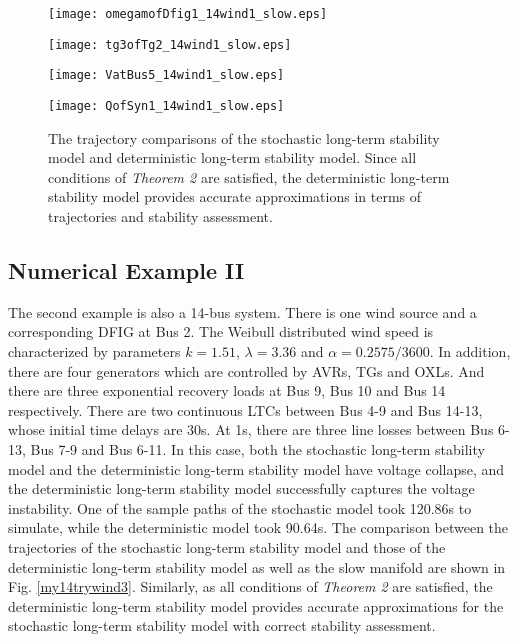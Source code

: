 \documentclass[journal]{IEEEtran}
\begin{document}
\begin{figure}[!ht]
\centering
\begin{minipage}[t]{0.5\linewidth}
\texttt{[image: omegamofDfig1\_14wind1\_slow.eps]}
\end{minipage}\begin{minipage}[t]{0.5\linewidth}
\texttt{[image: tg3ofTg2\_14wind1\_slow.eps]}
\end{minipage}
\begin{minipage}[t]{0.5\linewidth}
\texttt{[image: VatBus5\_14wind1\_slow.eps]}
\end{minipage}\begin{minipage}[t]{0.5\linewidth}
\texttt{[image: QofSyn1\_14wind1\_slow.eps]}
\end{minipage}
\caption{The trajectory comparisons of the stochastic long-term stability model and deterministic long-term stability model. Since all conditions of \textit{Theorem 2} are satisfied, the deterministic long-term stability model provides accurate approximations in terms of trajectories and stability assessment.}\label{my14wind1}
\end{figure}


\subsection{Numerical Example II}
The second example is also a 14-bus system. There is one wind source and a corresponding DFIG at Bus 2. The Weibull distributed wind speed is characterized by parameters $k=1.51$, $\lambda=3.36$ and $\alpha=0.2575/3600$. In addition, there are four generators which are controlled by AVRs, TGs and OXLs. And there are three exponential recovery loads at Bus 9, Bus 10 and Bus 14 respectively. There are two continuous LTCs between Bus 4-9 and Bus 14-13, whose initial time delays are 30s. At 1s, there are three line losses between Bus 6-13, Bus 7-9 and Bus 6-11. 
In this case, both the stochastic long-term stability model and the deterministic long-term stability model have voltage collapse, and the deterministic long-term stability model successfully captures the voltage instability. One of the sample paths of the stochastic model took 120.86s to simulate, while the deterministic model took 90.64s. The comparison between the trajectories of the stochastic long-term stability model and those of the deterministic long-term stability model as well as the slow manifold are shown in Fig. \ref{my14trywind3}. Similarly, as all conditions of \textit{Theorem 2} are satisfied, the deterministic long-term stability model provides accurate approximations for the stochastic long-term stability model with correct stability assessment.
\end{document}

